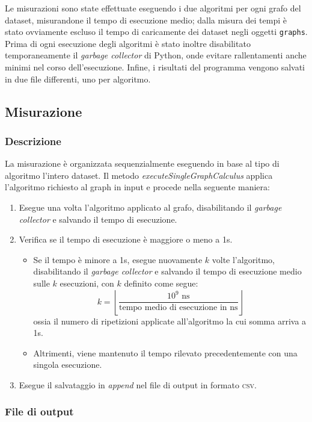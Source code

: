 Le misurazioni sono state effettuate eseguendo i due algoritmi per ogni grafo del dataset, misurandone il tempo di esecuzione medio; dalla misura dei tempi è stato ovviamente escluso il tempo di caricamente dei dataset negli oggetti \texttt{graphs}. Prima di ogni esecuzione degli algoritmi è stato inoltre disabilitato temporaneamente il \textit{garbage collector} di Python, onde evitare rallentamenti anche minimi nel corso dell'esecuzione. Infine, i risultati del programma vengono salvati in due file differenti, uno per algoritmo.

\subsection{Misurazione}

\subsubsection{Descrizione} 

La misurazione è organizzata sequenzialmente eseguendo in base al tipo di algoritmo l'intero dataset. Il metodo \textit{executeSingleGraphCalculus} applica l'algoritmo richiesto al graph in input e procede nella seguente maniera:

\begin{enumerate}
    \item Esegue una volta l'algoritmo applicato al grafo, disabilitando il \textit{garbage collector} e salvando il tempo di esecuzione.
    \item Verifica se il tempo di esecuzione è maggiore o meno a 1s.
    \begin{itemize}
        \item Se il tempo è minore a 1s, esegue nuovamente \(k\) volte l'algoritmo, disabilitando il \textit{garbage collector} e salvando il tempo di esecuzione medio sulle \(k\) esecuzioni, con \(k\) definito come segue:  \[ k = \left\lfloor\frac{10^9 \textrm{ ns}}{\textrm{tempo medio di esecuzione in ns}}\right\rfloor\]
        ossia il numero di ripetizioni applicate all'algoritmo la cui somma arriva a 1s.
        \item Altrimenti, viene mantenuto il tempo rilevato precedentemente con una singola esecuzione.
    \end{itemize}
    \item Esegue il salvataggio in \textit{append} nel file di output in formato \textsc{csv}.
\end{enumerate}


\subsubsection{File di output}

